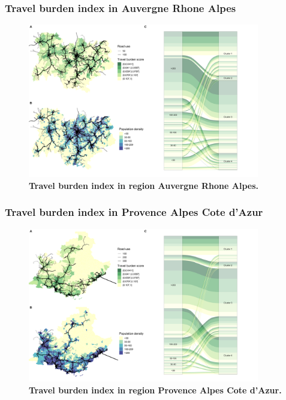 \subsubsection{Travel burden index in Auvergne Rhone Alpes}

\begin{figure}[H]
    \includegraphics[width=0.9\textwidth]{images/routes/fig4_84.png}
    \centering
    \caption{
        \textbf{Travel burden index in region Auvergne Rhone Alpes.}
    }
    \label{fig:routes-burden-index-ara}
\end{figure}

\subsubsection{Travel burden index in Provence Alpes Cote d'Azur}

\begin{figure}[H]
    \includegraphics[width=0.9\textwidth]{images/routes/fig4_93.png}
    \centering
    \caption{
        \textbf{Travel burden index in region Provence Alpes Cote d'Azur.}
    }
    \label{fig:routes-burden-index-paca}
\end{figure}

